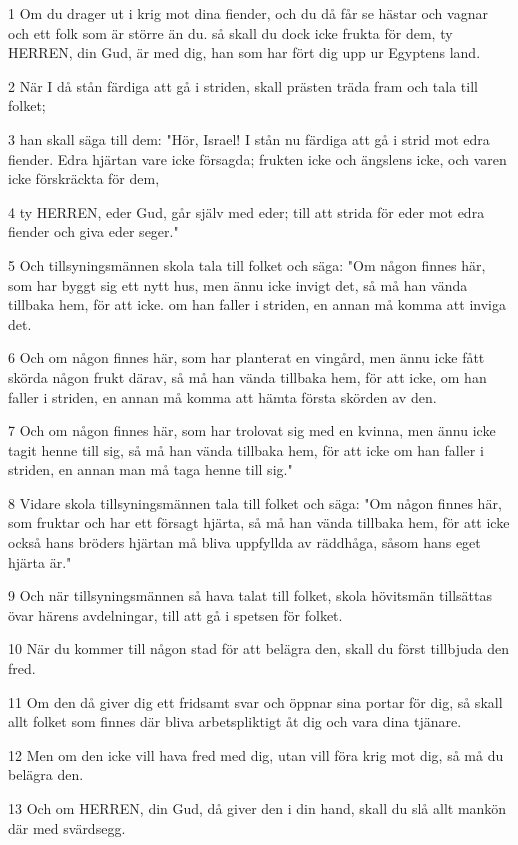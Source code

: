 \par 1 Om du drager ut i krig mot dina fiender, och du då får se hästar och vagnar och ett folk som är större än du. så skall du dock icke frukta för dem, ty HERREN, din Gud, är med dig, han som har fört dig upp ur Egyptens land.
\par 2 När I då stån färdiga att gå i striden, skall prästen träda fram och tala till folket;
\par 3 han skall säga till dem: "Hör, Israel! I stån nu färdiga att gå i strid mot edra fiender. Edra hjärtan vare icke försagda; frukten icke och ängslens icke, och varen icke förskräckta för dem,
\par 4 ty HERREN, eder Gud, går själv med eder; till att strida för eder mot edra fiender och giva eder seger."
\par 5 Och tillsyningsmännen skola tala till folket och säga: "Om någon finnes här, som har byggt sig ett nytt hus, men ännu icke invigt det, så må han vända tillbaka hem, för att icke. om han faller i striden, en annan må komma att inviga det.
\par 6 Och om någon finnes här, som har planterat en vingård, men ännu icke fått skörda någon frukt därav, så må han vända tillbaka hem, för att icke, om han faller i striden, en annan må komma att hämta första skörden av den.
\par 7 Och om någon finnes här, som har trolovat sig med en kvinna, men ännu icke tagit henne till sig, så må han vända tillbaka hem, för att icke om han faller i striden, en annan man må taga henne till sig."
\par 8 Vidare skola tillsyningsmännen tala till folket och säga: "Om någon finnes här, som fruktar och har ett försagt hjärta, så må han vända tillbaka hem, för att icke också hans bröders hjärtan må bliva uppfyllda av räddhåga, såsom hans eget hjärta är."
\par 9 Och när tillsyningsmännen så hava talat till folket, skola hövitsmän tillsättas övar härens avdelningar, till att gå i spetsen för folket.
\par 10 När du kommer till någon stad för att belägra den, skall du först tillbjuda den fred.
\par 11 Om den då giver dig ett fridsamt svar och öppnar sina portar för dig, så skall allt folket som finnes där bliva arbetspliktigt åt dig och vara dina tjänare.
\par 12 Men om den icke vill hava fred med dig, utan vill föra krig mot dig, så må du belägra den.
\par 13 Och om HERREN, din Gud, då giver den i din hand, skall du slå allt mankön där med svärdsegg.
